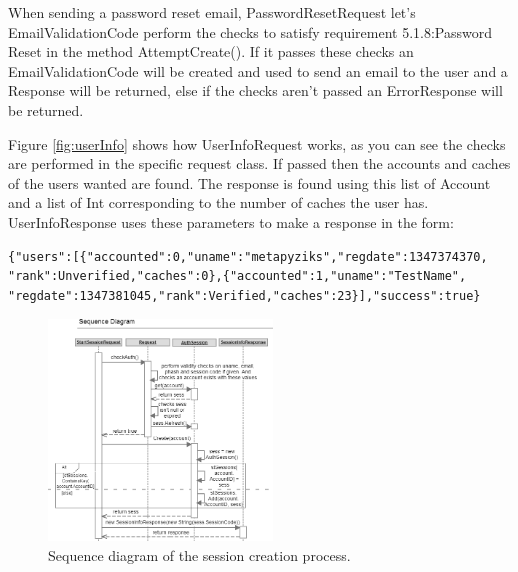 When sending a password reset email, PasswordResetRequest let's EmailValidationCode perform the checks to satisfy requirement 5.1.8:Password Reset in the method AttemptCreate(). If it passes these checks an EmailValidationCode will be created and used to send an email to the user and a Response will be returned, else if the checks aren't passed an ErrorResponse will be returned.

Figure \ref{fig:userInfo} shows how UserInfoRequest works, as you can see the checks are performed in the specific request class. If passed then the accounts and caches of the users wanted are found. The response is found using this list of Account and a list of Int corresponding to the number of caches the user has. UserInfoResponse uses these parameters to make a response in the form:

\begin{verbatim}
{"users":[{"accounted":0,"uname":"metapyziks","regdate":1347374370,
"rank":Unverified,"caches":0},{"accounted":1,"uname":"TestName",
"regdate":1347381045,"rank":Verified,"caches":23}],"success":true}
\end{verbatim}

\begin{figure}
    \includegraphics[width=0.53\textwidth]{images/sequence/createSession}
    \caption{Sequence diagram of the session creation process.}
\end{figure}

